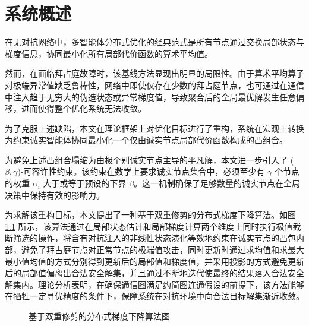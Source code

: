 \chapter{系统概述}

在无对抗网络中，多智能体分布式优化的经典范式是所有节点通过交换局部状态与梯度信息，协同最小化所有局部代价函数的算术平均值。

然而，在面临拜占庭故障时，该基线方法显现出明显的局限性。由于算术平均算子对极端异常值缺乏鲁棒性，网络中即使仅存在少数的拜占庭节点，也可通过在通信中注入趋于无穷大的伪造状态或异常梯度值，导致聚合后的全局最优解发生任意偏移，进而使得整个优化系统无法收敛。

为了克服上述缺陷，本文在理论框架上对优化目标进行了重构，系统在宏观上转换为约束诚实智能体协同最小化一个仅由诚实节点局部代价函数构成的凸组合。

为避免上述凸组合塌缩为由极个别诚实节点主导的平凡解，本文进一步引入了 ($\beta, \gamma$)-可容许性约束。该约束在数学上要求诚实节点集合中，必须至少有 $\gamma$ 个节点的权重 $\alpha_i$ 大于或等于预设的下界 $\beta$。这一机制确保了足够数量的诚实节点在全局决策中保持有效的影响力。

为求解该重构目标，本文提出了一种基于双重修剪的分布式梯度下降算法。如图 \ref{fig:example} 所示，该算法通过在局部状态估计和局部梯度计算两个维度上同时执行极值截断筛选的操作，将含有对抗注入的非线性状态演化等效地约束在诚实节点的凸包内部，避免了拜占庭节点对正常节点的极端值攻击，同时更新时通过求均值和求最大最小值均值的方式分别得到更新后的局部值和梯度值，并采用投影的方式避免更新后的局部值偏离出合法安全解集，并且通过不断地迭代使最终的结果落入合法安全解集内。理论分析表明，在确保通信图满足约简图连通假设的前提下，该方法能够在牺牲一定寻优精度的条件下，保障系统在对抗环境中向合法目标解集渐近收敛。

\begin{figure}[h]
    \centering
    
    \caption{基于双重修剪的分布式梯度下降算法图}
    \label{fig:example}
\end{figure}

